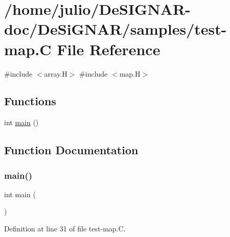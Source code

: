 \hypertarget{test-map_8_c}{}\section{/home/julio/\+De\+S\+I\+G\+N\+A\+R-\/doc/\+De\+Si\+G\+N\+A\+R/samples/test-\/map.C File Reference}
\label{test-map_8_c}
{\ttfamily \#include $<$array.\+H$>$}\newline
{\ttfamily \#include $<$map.\+H$>$}\newline
\subsection*{Functions}
\begin{DoxyCompactItemize}
\item 
int \hyperlink{test-map_8_c_ae66f6b31b5ad750f1fe042a706a4e3d4}{main} ()
\end{DoxyCompactItemize}


\subsection{Function Documentation}
\mbox{\label{test-map_8_c_ae66f6b31b5ad750f1fe042a706a4e3d4}} 
\subsubsection{\texorpdfstring{main()}{main()}}
{\footnotesize\ttfamily int main (\begin{DoxyParamCaption}{ }\end{DoxyParamCaption})}



Definition at line 31 of file test-\/map.\+C.

